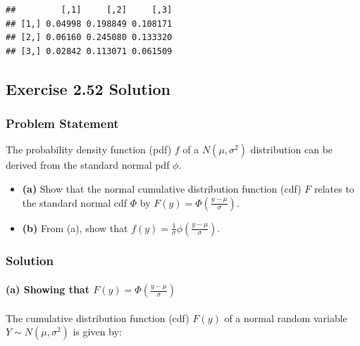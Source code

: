 \documentclass[
]{article}
\providecommand{\tightlist}{%
  \setlength{\itemsep}{0pt}\setlength{\parskip}{0pt}}
\begin{document}
\begin{verbatim}
##         [,1]     [,2]     [,3]
## [1,] 0.04998 0.198849 0.108171
## [2,] 0.06160 0.245080 0.133320
## [3,] 0.02842 0.113071 0.061509
\end{verbatim}

\hypertarget{exercise-2.52-solution}{%
\subsection{Exercise 2.52 Solution}\label{exercise-2.52-solution}}

\hypertarget{problem-statement-4}{%
\subsubsection{Problem Statement}\label{problem-statement-4}}

The probability density function (pdf) \(f\) of a \(N(\mu, \sigma^2)\)
distribution can be derived from the standard normal pdf \(\phi\).

\begin{itemize}
\tightlist
\item
  \textbf{(a)} Show that the normal cumulative distribution function
  (cdf) \(F\) relates to the standard normal cdf \(\Phi\) by
  \(F(y) = \Phi \left( \frac{y - \mu}{\sigma} \right)\).
\item
  \textbf{(b)} From (a), show that
  \(f(y) = \frac{1}{\sigma} \phi \left( \frac{y - \mu}{\sigma} \right)\).
\end{itemize}

\hypertarget{solution-4}{%
\subsubsection{Solution}\label{solution-4}}

\hypertarget{a-showing-that-fy-phi-left-fracy---musigma-right}{%
\paragraph{\texorpdfstring{(a) Showing that
\(F(y) = \Phi \left( \frac{y - \mu}{\sigma} \right)\)}{(a) Showing that F(y) = \textbackslash Phi \textbackslash left( \textbackslash frac\{y - \textbackslash mu\}\{\textbackslash sigma\} \textbackslash right)}}\label{a-showing-that-fy-phi-left-fracy---musigma-right}}

The cumulative distribution function (cdf) \(F(y)\) of a normal random
variable \(Y \sim N(\mu, \sigma^2)\) is given by:
\end{document}
